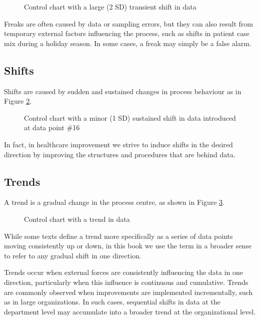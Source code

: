 \documentclass[
]{book}
\makeatletter
\newcommand*\pandocbounded[1]{%
  \sbox\pandoc@box{#1}%
  \Gscale@div\@tempa{\textheight}{\dimexpr\ht\pandoc@box+\dp\pandoc@box\relax}%
  \Gscale@div\@tempb{\linewidth}{\wd\pandoc@box}%
  \ifdim\@tempb\p@<\@tempa\p@\let\@tempa\@tempb\fi%
  \ifdim\@tempa\p@<\p@\scalebox{\@tempa}{\usebox\pandoc@box}%
  \else\usebox{\pandoc@box}%
  \fi%
}
\makeatother
\begin{document}
\begin{figure}
\centering
\pandocbounded{}
\caption{\label{fig:testing-fig2}Control chart with a large (2 SD) transient shift in data}
\end{figure}

Freaks are often caused by data or sampling errors, but they can also result from temporary external factors influencing the process, such as shifts in patient case mix during a holiday season. In some cases, a freak may simply be a false alarm.

\subsection{Shifts}\label{shifts}

Shifts are caused by sudden and sustained changes in process behaviour as in Figure \ref{fig:testing-fig3}.

\begin{figure}
\centering
\pandocbounded{}
\caption{\label{fig:testing-fig3}Control chart with a minor (1 SD) sustained shift in data introduced at data point \#16}
\end{figure}

In fact, in healthcare improvement we strive to induce shifts in the desired direction by improving the structures and procedures that are behind data.

\subsection{Trends}\label{trends}

A trend is a gradual change in the process centre, as shown in Figure \ref{fig:testing-fig4}.

\begin{figure}
\centering
\pandocbounded{}
\caption{\label{fig:testing-fig4}Control chart with a trend in data}
\end{figure}

While some texts define a trend more specifically as a series of data points moving consistently up or down, in this book we use the term in a broader sense to refer to any gradual shift in one direction.

Trends occur when external forces are consistently influencing the data in one direction, particularly when this influence is continuous and cumulative. Trends are commonly observed when improvements are implemented incrementally, such as in large organizations. In such cases, sequential shifts in data at the department level may accumulate into a broader trend at the organizational level.
\end{document}
